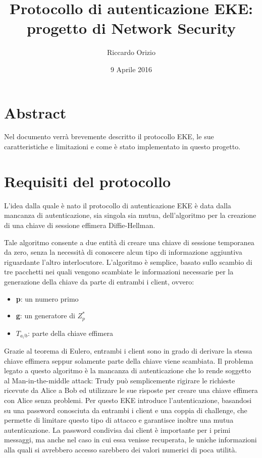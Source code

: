 \documentclass[10pt, letterpaper]{article}
\title{Protocollo di autenticazione EKE:\\ progetto di Network Security}
\author{Riccardo Orizio}
\date{9 Aprile 2016}
\begin{document}
\maketitle

\section{Abstract}
Nel documento verrà brevemente descritto il protocollo EKE, le sue
caratteristiche e limitazioni e come è stato implementato in questo progetto.

\section{Requisiti del protocollo}
L'idea dalla quale è nato il protocollo di autenticazione EKE è data dalla
mancanza di autenticazione, sia singola sia mutua, dell'algoritmo per la
creazione di una chiave di sessione effimera Diffie-Hellman.

Tale algoritmo consente a due entità di creare una chiave di sessione temporanea
da zero, senza la necessità di conoscere alcun tipo di informazione aggiuntiva
riguardante l'altro interlocutore.
L'algoritmo è semplice, basato sullo scambio di tre pacchetti nei quali vengono
scambiate le informazioni necessarie per la generazione della chiave da parte di
entrambi i client, ovvero:
\begin{itemize}
	\item \textbf{p}: un numero primo
	\item \textbf{g}: un generatore di $Z_p^*$
	\item \textbf{$T_{a/b}$}: parte della chiave effimera
\end{itemize}
Grazie al teorema di Eulero, entrambi i client sono in grado di derivare la
stessa chiave effimera seppur solamente parte della chiave viene scambiata.
Il problema legato a questo algoritmo è la mancanza di autenticazione che lo
rende soggetto al Man-in-the-middle attack: Trudy può semplicemente rigirare le
richieste ricevute da Alice a Bob ed utilizzare le sue risposte per creare una
chiave effimera con Alice senza problemi.
Per questo EKE introduce l'autenticazione, basandosi su una password conosciuta
da entrambi i client e una coppia di challenge, che permette di limitare questo
tipo di attacco e garantisce inoltre una mutua autenticazione.
La password condivisa dai client è importante per i primi messaggi, ma anche nel
caso in cui essa venisse recuperata, le uniche informazioni alla quali si
avrebbero accesso sarebbero dei valori numerici di poca utilità.
\end{document}
